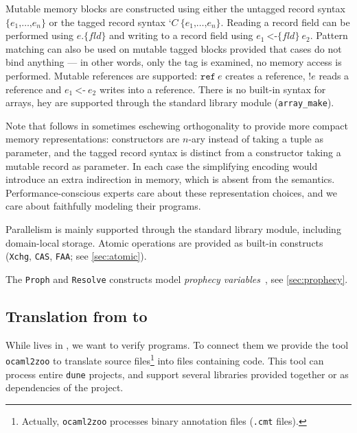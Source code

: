 Mutable memory blocks are constructed using either the untagged record syntax $\texttt{\{} e_1 \texttt{,} \dots \texttt{,} e_n \texttt{\}}$ or the tagged record syntax $\texttt{‘} C\ \texttt{\{} e_1 \texttt{,} \dots \texttt{,} e_n \texttt{\}}$.
Reading a record field can be performed using $e \texttt{.\{} \mathit{fld} \texttt{\}}$ and writing to a record field using $e_1\ \texttt{<-\{} \mathit{fld} \texttt{\}}\ e_2$.
Pattern matching can also be used on mutable tagged blocks provided that cases do not bind anything --- in other words, only the tag is examined, no memory access is performed.
Mutable references are supported: $\texttt{ref}\ e$ creates a reference, $\texttt{!} e$ reads a reference and $e_1\ \texttt{<-}\ e_2$ writes into a reference.
There is no built-in syntax for arrays, hey are supported through the  standard library module (\eg \texttt{array\_make}).

Note that \ZooLang follows \OCaml in sometimes eschewing orthogonality to provide more compact memory representations: constructors are $n$-ary instead of taking a tuple as parameter, and the tagged record syntax is distinct from a constructor taking a mutable record as parameter. In each case the simplifying encoding would introduce an extra indirection in memory, which is absent from the \ZooLang semantics. Performance-conscious experts care about these representation choices, and we care about faithfully modeling their programs.

Parallelism is mainly supported through the  standard library module, including domain-local storage. Atomic operations are provided as built-in constructs (\texttt{Xchg}, \texttt{CAS}, \texttt{FAA}; see \cref{sec:atomic}).

The \texttt{Proph} and \texttt{Resolve} constructs model \emph{prophecy variables}~\cite{DBLP:journals/pacmpl/JungLPRTDJ20}, see \cref{sec:prophecy}.

\subsection{Translation from \OCaml to \ZooLang}



While \ZooLang lives in \Rocq, we want to verify \OCaml programs.
To connect them we provide the tool \texttt{ocaml2zoo} to translate \OCaml source files\footnote{Actually, \texttt{ocaml2zoo} processes binary annotation files (\texttt{.cmt} files).} into \Rocq files containing \ZooLang code.
This tool can process entire \texttt{dune} projects, and support several libraries provided together or as dependencies of the project.

